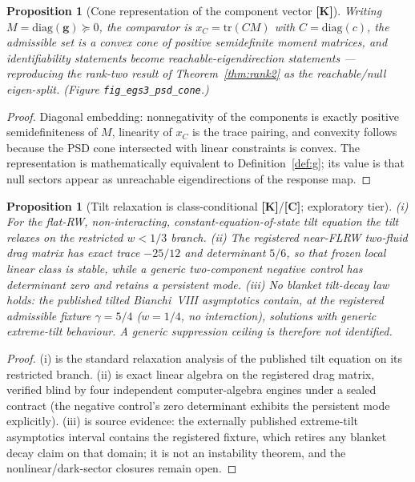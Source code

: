 \documentclass[10pt]{article}
\newtheorem{proposition}[theorem]{Proposition}
\theoremstyle{definition}
\newcommand{\code}[1]{\texttt{\small #1}}
\newcommand{\tier}[1]{\textbf{[#1]}}
\begin{document}
\begin{proposition}[Cone representation of the component vector
\tier{K}]
\label{prop:psd}
Writing $M = \mathrm{diag}(\bm g) \succeq 0$, the comparator is
$x_C = \mathrm{tr}(C M)$ with $C = \mathrm{diag}(c)$, the admissible
set is a convex cone of positive semidefinite moment matrices, and
identifiability statements become reachable-eigendirection statements
--- reproducing the rank-two result of Theorem~\ref{thm:rank2} as the
reachable/null eigen-split. (Figure \code{fig\_egs3\_psd\_cone}.)
\end{proposition}
\begin{proof}
Diagonal embedding: nonnegativity of the components is exactly
positive semidefiniteness of $M$, linearity of $x_C$ is the trace
pairing, and convexity follows because the PSD cone intersected with
linear constraints is convex. The representation is mathematically
equivalent to Definition~\ref{def:g}; its value is that null sectors
appear as unreachable eigendirections of the response map.
\end{proof}

\begin{proposition}[Tilt relaxation is class-conditional
\tier{K}/\tier{C}; exploratory tier]
\label{prop:tilt}
(i) For the flat-RW, non-interacting, constant-equation-of-state tilt
equation the tilt relaxes on the restricted $w < 1/3$ branch.
(ii) The registered near-FLRW two-fluid drag matrix has exact trace
$-25/12$ and determinant $5/6$, so that frozen local linear class is
stable, while a generic two-component negative control has determinant
zero and retains a persistent mode. (iii) No blanket tilt-decay law
holds: the published tilted Bianchi~VIII asymptotics
\cite{ColeyHervik2005} contain, at the registered admissible fixture
$\gamma = 5/4$ ($w = 1/4$, no interaction), solutions with generic
extreme-tilt behaviour. A generic suppression ceiling is therefore not
identified.
\end{proposition}
\begin{proof}
(i) is the standard relaxation analysis of the published tilt
equation on its restricted branch. (ii) is exact linear algebra on
the registered drag matrix, verified blind by four independent
computer-algebra engines under a sealed contract (the negative
control's zero determinant exhibits the persistent mode explicitly).
(iii) is source evidence: the externally published extreme-tilt
asymptotics interval contains the registered fixture, which retires
any blanket decay claim on that domain; it is not an instability
theorem, and the nonlinear/dark-sector closures remain open.
\end{proof}
\end{document}
